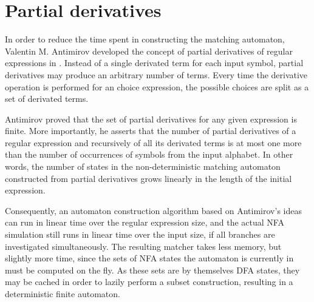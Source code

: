 \section{Partial derivatives}

In order to reduce the time spent in constructing the matching automaton,
Valentin M. Antimirov developed the concept of partial derivatives of regular
expressions in \cite{antimirov}. Instead of a single derivated term for each
input symbol, partial derivatives may produce an arbitrary number of terms.
Every time the derivative operation is performed for an choice expression, the
possible choices are split as a set of derivated terms.

Antimirov proved that the set of partial derivatives for any given expression is
finite. More importantly, he asserts that the number of partial derivatives of a
regular expression and recursively of all its derivated terms is at most one
more than the number of occurrences of symbols from the input alphabet. In other
words, the number of states in the non-deterministic matching automaton
constructed from partial derivatives grows linearly in the length of the initial
expression.

Consequently, an automaton construction algorithm based on Antimirov's ideas can
run in linear time over the regular expression size, and the actual NFA
simulation still runs in linear time over the input size, if all branches are
investigated simultaneously. The resulting matcher takes less memory, but
slightly more time, since the sets of NFA states the automaton is currently in
must be computed on the fly. As these sets are by themselves DFA states, they
may be cached in order to lazily perform a subset construction, resulting in a
deterministic finite automaton.


